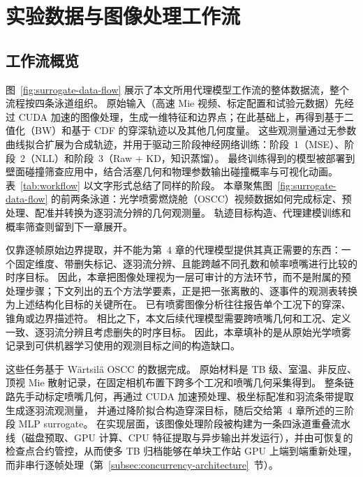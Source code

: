 \section{实验数据与图像处理工作流}

\subsection{工作流概览}

图~\ref{fig:surrogate-data-flow} 展示了本文所用代理模型工作流的整体数据流，整个流程按四条泳道组织。
原始输入（高速 Mie 视频、标定配置和试验元数据）先经过 CUDA 加速的图像处理，生成一维特征和边界点；在此基础上，再得到基于二值化（BW）和基于 CDF 的穿深轨迹以及其他几何度量。
这些观测量通过无参数曲线拟合扩展为合成轨迹，并用于驱动三阶段神经网络训练：阶段~1（MSE）、阶段~2（NLL）和阶段~3（Raw + KD，知识蒸馏）。
最终训练得到的模型被部署到壁面碰撞筛查应用中，结合活塞几何和物理参数输出碰撞概率与可视化动画。
表~\ref{tab:workflow} 以文字形式总结了同样的阶段。
本章聚焦图~\ref{fig:surrogate-data-flow} 的前两条泳道：光学喷雾燃烧舱（OSCC）视频数据如何完成标定、预处理、配准并转换为逐羽流分辨的几何观测量。
轨迹目标构造、代理建模训练和概率筛查则留到下一章展开。

仅靠逐帧原始边界提取，并不能为第~4 章的代理模型提供其真正需要的东西：一个固定维度、带删失标记、逐羽流分辨、且能跨越不同孔数和帧率喷嘴进行比较的时序目标。
因此，本章把图像处理视为一层可审计的方法环节，而不是附属的预处理步骤；下文列出的五个方法学要素，正是把一张离散的、逐事件的观测表转换为上述结构化目标的关键所在。
已有喷雾图像分析往往报告单个工况下的穿深、锥角或边界描述符。
相比之下，本文后续代理模型需要跨喷嘴几何和工况、定义一致、逐羽流分辨且考虑删失的时序目标。
因此，本章填补的是从原始光学喷雾记录到可供机器学习使用的观测目标之间的构造缺口。

这些任务基于 Wärtsilä OSCC 的数据完成。
原始材料是 TB 级、室温、非反应、顶视 Mie 散射记录，在固定相机布置下跨多个工况和喷嘴几何采集得到。
整条链路先手动标定喷嘴几何，再通过 CUDA 加速预处理、极坐标配准和羽流条带提取生成逐羽流观测量，
并通过降阶拟合构造穿深目标，随后交给第~4 章所述的三阶段 MLP surrogate。
在实现层面，该图像处理阶段被构建为一条四泳道重叠流水线（磁盘预取、GPU 计算、CPU 特征提取与异步输出并发运行），并由可恢复的检查点合约管控，从而使多 TB 归档能够在单块工作站 GPU 上端到端重新处理，而非串行逐帧处理（第~\ref{subsec:concurrency-architecture}~节）。

